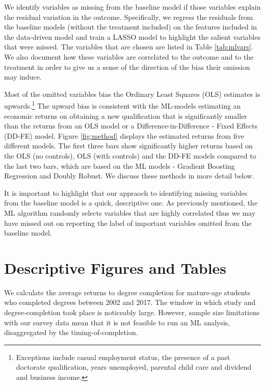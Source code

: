 \documentclass[12pt, a4paper]{article}
\begin{document}
We identify variables as missing from the baseline model if those variables explain the residual variation in the outcome. Specifically, we regress the residuals from the baseline models (without the treatment included) on the features included in the data-driven model and train a LASSO model to highlight the salient variables that were missed. The variables that are chosen are listed in Table \ref{tab:mlvars}. We also document how these variables are correlated to the outcome and to the treatment in order to give us a sense of the direction of the bias their omission may induce. 

Most of the omitted variables bias the Ordinary Least Squares (OLS) estimates is upwards.\footnote{Exceptions include casual employment status, the presence of a past doctorate qualification, years unemployed, parental child care and dividend and business income.} The upward bias is consistent with the ML-models estimating an economic returns on obtaining a new qualification that is significantly smaller than the returns from an OLS model or a Difference-in-Difference - Fixed Effects (DD-FE)  model. Figure \ref{fig:method} displays the estimated returns from five different models. The first three bars show significantly higher returns based on the OLS (no controls), OLS (with controls) and the DD-FE models compared to the last two bars, which are based on the ML models - Gradient Boosting Regression and Doubly Robust. We discuss these methods in more detail below. 

It is important to highlight that our appraoch to identifying missing variables from the baseline model is a quick, descriptive one. As previously mentioned, the ML algorithm randomly selects variables that are highly correlated thus we may have missed out on reporting the label of important variables omitted from the baseline model.



\section{Descriptive Figures and Tables}

We calculate the average returns to degree completion for mature-age students who completed degrees between 2002 and 2017. The window in which study and degree-completion took place is noticeably large. However, sample size limitations with our survey data mean that it is not feasible to run an ML analysis, disaggregated by the timing-of-completion.
\end{document}
